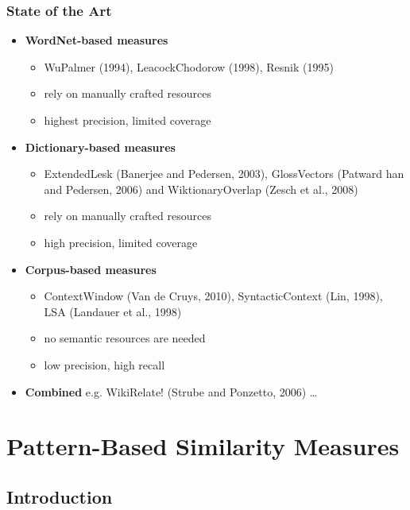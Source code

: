 \documentclass{beamer}
\begin{document}
\begin{frame}
\frametitle{State of the Art}

\begin{itemize}
  \item \textbf{WordNet-based measures}

  \begin{itemize}
  	\item WuPalmer (1994), LeacockChodorow (1998), Resnik (1995)
  	\item rely on manually crafted resources
  	\item highest precision, limited coverage   
  \end{itemize}
  
  \item \textbf{Dictionary-based measures}
	\begin{itemize}
	  \item ExtendedLesk (Banerjee and Pedersen, 2003), GlossVectors (Patward
han and Pedersen, 2006) and WiktionaryOverlap (Zesch et al., 2008)
	\item rely on manually crafted resources
	 \item high precision, limited coverage
	\end{itemize}

\item  \textbf{Corpus-based measures}
\begin{itemize}
  \item ContextWindow (Van de Cruys, 2010), SyntacticContext (Lin, 1998),  LSA (Landauer et al., 1998)
  
 \item no semantic resources are needed
 \item low precision, high recall 
\end{itemize}

\item \textbf{Combined} e.g. WikiRelate! (Strube and Ponzetto, 2006) \ldots
\end{itemize}
\end{frame}



\section{Pattern-Based Similarity Measures}
\subsection{Introduction}
\end{document}
